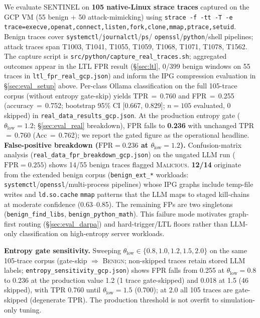 \documentclass[journal]{IEEEtran}
\begin{document}
We evaluate SENTINEL on \textbf{105 native-Linux strace traces} captured on the
GCP VM (55 benign + 50 attack-mimicking) using
\texttt{strace -f -tt -T -e trace=execve,openat,}\allowbreak\texttt{connect,listen,fork,clone,}\allowbreak\texttt{mmap,ptrace,setuid}.
Benign traces cover \texttt{systemctl}/\texttt{journalctl}/\texttt{ps}/
\texttt{openssl}/\texttt{python}/shell pipelines; attack traces span T1003,
T1041, T1055, T1059, T1068, T1071, T1078, T1562. The capture script is
\texttt{src/python/capture\_real\_traces.sh}; aggregated outcomes appear in
the LTL FPR result (\S\ref{sec:ltl}, 0/399 benign windows on 55 traces in
\texttt{ltl\_fpr\_real\_gcp.json})
and inform the IPG compression evaluation in \S\ref{sec:eval_setup} above.
Per-class Ollama classification on the full 105-trace corpus (without entropy
gate-skip) yields TPR\,$=$\,0.760 and FPR\,$=$\,0.255 (accuracy\,$=$\,0.752;
bootstrap 95\% CI [0.667, 0.829]; $n{=}105$ evaluated, 0 skipped) in
\texttt{real\_data\_results\_gcp.json}.  At the production entropy gate
($\theta_{\mathrm{low}}{=}1.2$; \S\ref{sec:eval_real} breakdown), FPR falls to
\textbf{0.236} with unchanged TPR\,$=$\,0.760 (Acc\,$=$\,0.762); we report the
gated figure as the operational headline.
\noindent\textbf{False-positive breakdown ($\mathrm{FPR}{=}0.236$ at $\theta_{\mathrm{low}}{=}1.2$).}
Confusion-matrix analysis (\texttt{real\_data\_fpr\_breakdown\_gcp.json}) on the
ungated LLM run ($\mathrm{FPR}{=}0.255$) shows
14/55 benign traces flagged \textsc{Malicious}.  \textbf{12/14} originate from
the extended benign corpus (\texttt{benign\_ext\_*} workloads:
\texttt{systemctl}/\texttt{openssl}/multi-process pipelines) whose IPG graphs
include temp-file writes and \texttt{ld.so.cache} \texttt{mmap} patterns that
the LLM maps to staged kill-chains at moderate confidence (0.63--0.85).  The
remaining FPs are two singletons (\texttt{benign\_find\_libs},
\texttt{benign\_python\_math}).  This failure mode
motivates graph-first routing (\S\ref{sec:eval_darpa}) and hard-trigger/LTL
floors rather than LLM-only classification on high-entropy server workloads.

\noindent\textbf{Entropy gate sensitivity.}
Sweeping $\theta_{\mathrm{low}} \in \{0.8, 1.0, 1.2, 1.5, 2.0\}$ on the same
105-trace corpus (gate-skip $\Rightarrow$ \textsc{Benign}; non-skipped traces
retain stored LLM labels; \texttt{entropy\_sensitivity\_gcp.json}) shows FPR
falls from 0.255 at $\theta_{\mathrm{low}}{=}0.8$ to 0.236 at the production
value 1.2 (1 trace gate-skipped) and 0.018 at 1.5 (46 skipped), with TPR
0.760 until $\theta_{\mathrm{low}}{=}1.5$ (0.700); at 2.0 all 105 traces are
gate-skipped (degenerate TPR).  The production threshold
is not overfit to simulation-only tuning.
\end{document}
